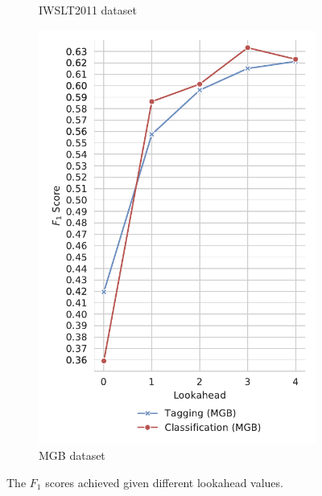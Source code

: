 \documentclass[bsc,deptreport,ai]{infthesis} %
\begin{document}
\begin{figure}
\begin{subfigure}{.49\textwidth}
\caption{IWSLT2011 dataset}
\end{subfigure}
\begin{subfigure}{.49\textwidth}
\centering
\includegraphics[width=.95\textwidth]{tagclassmgb.pdf}
\caption{MGB dataset}
\end{subfigure}
\caption{The $F_1$ scores achieved given different lookahead values.}
\label{fig:baselinelookahead}
\end{figure}
\end{document}
